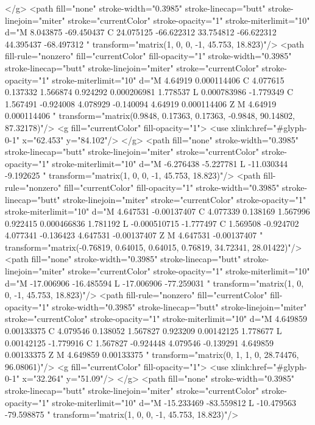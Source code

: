 </g>
<path fill="none" stroke-width="0.3985" stroke-linecap="butt" stroke-linejoin="miter" stroke="currentColor" stroke-opacity="1" stroke-miterlimit="10" d="M 8.043875 -69.450437 C 24.075125 -66.622312 33.754812 -66.622312 44.395437 -68.497312 " transform="matrix(1, 0, 0, -1, 45.753, 18.823)"/>
<path fill-rule="nonzero" fill="currentColor" fill-opacity="1" stroke-width="0.3985" stroke-linecap="butt" stroke-linejoin="miter" stroke="currentColor" stroke-opacity="1" stroke-miterlimit="10" d="M 4.64919 0.000114406 C 4.077615 0.137332 1.566874 0.924292 0.000206981 1.778537 L 0.000783986 -1.779349 C 1.567491 -0.924008 4.078929 -0.140094 4.64919 0.000114406 Z M 4.64919 0.000114406 " transform="matrix(0.9848, 0.17363, 0.17363, -0.9848, 90.14802, 87.32178)"/>
<g fill="currentColor" fill-opacity="1">
<use xlink:href="#glyph-0-1" x="62.453" y="84.102"/>
</g>
<path fill="none" stroke-width="0.3985" stroke-linecap="butt" stroke-linejoin="miter" stroke="currentColor" stroke-opacity="1" stroke-miterlimit="10" d="M -6.276438 -5.227781 L -11.030344 -9.192625 " transform="matrix(1, 0, 0, -1, 45.753, 18.823)"/>
<path fill-rule="nonzero" fill="currentColor" fill-opacity="1" stroke-width="0.3985" stroke-linecap="butt" stroke-linejoin="miter" stroke="currentColor" stroke-opacity="1" stroke-miterlimit="10" d="M 4.647531 -0.00137407 C 4.077339 0.138169 1.567996 0.922415 0.000466836 1.781192 L -0.000510715 -1.777497 C 1.569508 -0.924702 4.077341 -0.136423 4.647531 -0.00137407 Z M 4.647531 -0.00137407 " transform="matrix(-0.76819, 0.64015, 0.64015, 0.76819, 34.72341, 28.01422)"/>
<path fill="none" stroke-width="0.3985" stroke-linecap="butt" stroke-linejoin="miter" stroke="currentColor" stroke-opacity="1" stroke-miterlimit="10" d="M -17.006906 -16.485594 L -17.006906 -77.259031 " transform="matrix(1, 0, 0, -1, 45.753, 18.823)"/>
<path fill-rule="nonzero" fill="currentColor" fill-opacity="1" stroke-width="0.3985" stroke-linecap="butt" stroke-linejoin="miter" stroke="currentColor" stroke-opacity="1" stroke-miterlimit="10" d="M 4.649859 0.00133375 C 4.079546 0.138052 1.567827 0.923209 0.00142125 1.778677 L 0.00142125 -1.779916 C 1.567827 -0.924448 4.079546 -0.139291 4.649859 0.00133375 Z M 4.649859 0.00133375 " transform="matrix(0, 1, 1, 0, 28.74476, 96.08061)"/>
<g fill="currentColor" fill-opacity="1">
<use xlink:href="#glyph-0-1" x="32.264" y="51.09"/>
</g>
<path fill="none" stroke-width="0.3985" stroke-linecap="butt" stroke-linejoin="miter" stroke="currentColor" stroke-opacity="1" stroke-miterlimit="10" d="M -15.233469 -83.559812 L -10.479563 -79.598875 " transform="matrix(1, 0, 0, -1, 45.753, 18.823)"/>
